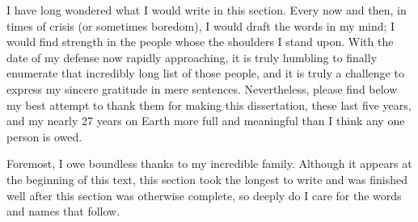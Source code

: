 \begin{acknowledgements}
I have long wondered what I would write in this section. 
Every now and then, in times of crisis (or sometimes boredom), I would draft the words in my mind; I would find strength in the people whose the shoulders I stand upon. 
With the date of my defense now rapidly approaching, it is truly humbling to finally enumerate that incredibly long list of those people, and it is truly a challenge to express my sincere gratitude in mere sentences. 
Nevertheless, please find below my best attempt to thank them for making this dissertation, these last five years, and my nearly 27 years on Earth more full and meaningful than I think any one person is owed.

Foremost, I owe boundless thanks to my incredible family. 
Although it appears at the beginning of this text, this section took the longest to write and was finished well after this section was otherwise complete, so deeply do I care for the words and names that follow. 


\end{acknowledgements}
